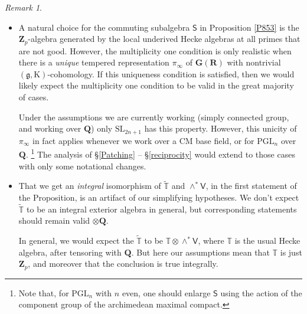 \documentclass[10pt]{amsart}
\newcommand{\changecolor}{black}
\newcommand{\Z}{\mathbf{Z}}
\newcommand{\gHecke}{\tilde{\mathbb{T}}}
\newcommand{\SL}{\mathrm{SL}}
\newcommand{\Vinf}{\mathsf{V}}
\newcommand{\Q}{\mathbf{Q}}
\newcommand{\R}{\mathbf{R}}
\newcommand{\PGL}{\mathrm{PGL}}
\theoremstyle{remark}
\newtheorem*{remark}{Remark}
\newcommand{\BWq}{\mathsf{q}}
\begin{document}
 
 \begin{remark}
 \begin{itemize}
\item[-] {\color{\changecolor}  A natural choice for the commuting subalgebra $\mathsf{S}$ in Proposition \ref{P853} is
  the $\Z_p$-algebra generated by the local underived Hecke algebras at all primes that are not good.
  However, the multiplicity one condition is only realistic  when there is a  {\em unique} tempered representation $\pi_{\infty}$ of $\mathbf{G}(\R)$ with nontrivial $(\mathfrak{g}, \mathrm{K})$-cohomology.
  If this uniqueness condition is satisfied, then we would likely expect the multiplicity one condition to be valid in the great majority of cases. 
 
%    
 

Under the assumptions we are currently working (simply connected group, and working over $\Q$) only $\SL_{2n+1}$
has this property. However, this unicity of $\pi_{\infty}$ in fact applies
whenever we work over a CM base field, or for $\PGL_n$ over $\Q$. \footnote{Note that, for $\PGL_n$ with $n$ even, 
one should enlarge $\mathsf{S}$ using the action of the component group of the archimedean maximal compact.} 
The analysis of \S \ref{Patching} -- \S \ref{reciprocity}
would extend to those cases with only some  notational changes.   } 
 
 
 
 

\item[-] That we get an {\em integral} isomorphism of $\gHecke$ and $\wedge^* \Vinf$, in the first statement of the Proposition, is an artifact of our simplifying hypotheses. We don't expect $\gHecke$
to be an integral exterior algebra in general, but corresponding statements should remain valid $\otimes \Q$. 
 
 In general,
 we would expect the $\gHecke$ to be $\mathbb{T} \otimes \wedge^* \mathsf{V}$, where $\mathbb{T}$
 is the usual Hecke algebra,   after tensoring with $\Q$. But here our assumptions mean that $\mathbb{T}$ is just $\Z_p$,
 and moreover that the conclusion is true integrally.
\end{itemize}
\end{remark}
\end{document}
